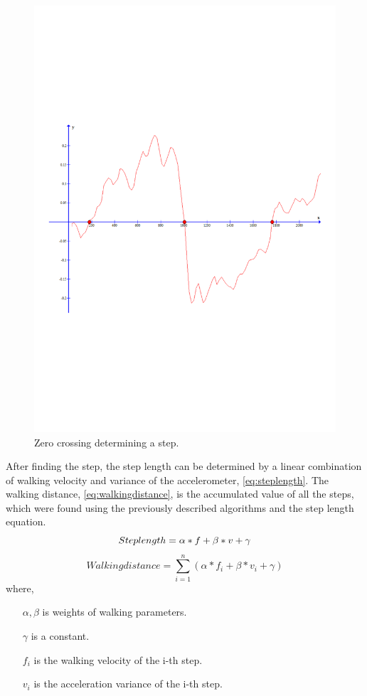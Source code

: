 \begin{figure}[H]
\centering
\includegraphics[trim=0 8cm 0cm 8cm, clip,scale=0.5]{media/zero-crossing}
\caption{Zero crossing determining a step.}
\label{figure:zero-crossing}
\end{figure}

After finding the step, the step length can be determined by a linear combination of walking velocity and variance of the accelerometer, \eqref{eq:steplength}. 
The walking distance, \eqref{eq:walkingdistance}, is the accumulated value of all the steps, which were found using the previously described algorithms and the step length equation.
\begin{equation}\label{eq:steplength}
	Step length = \alpha * f + \beta * v + \gamma \\
\end{equation}
\begin{equation}\label{eq:walkingdistance}
	Walking distance = \sum\limits_{i=1}^{n} (\alpha * f_i + \beta * v_i + \gamma)
\end{equation}
where,
\begin{itemize}
	\item[$\alpha , \beta$] is weights of walking parameters.
	\item[$\gamma$] is a constant.
	\item[$f_i$] is the walking velocity of the i-th step.
	\item[$v_i$] is the acceleration variance of the i-th step.
\end{itemize}

